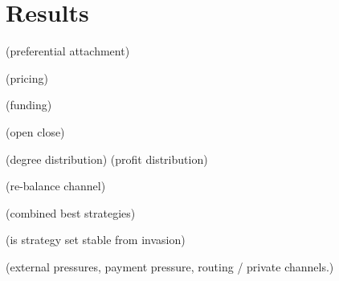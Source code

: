 \chapter{Results}


(preferential attachment)

(pricing)

(funding)

(open close)

(degree distribution)
(profit distribution)

(re-balance channel)

(combined best strategies)

(is strategy set stable from invasion)

(external pressures, payment pressure, routing / private channels.)